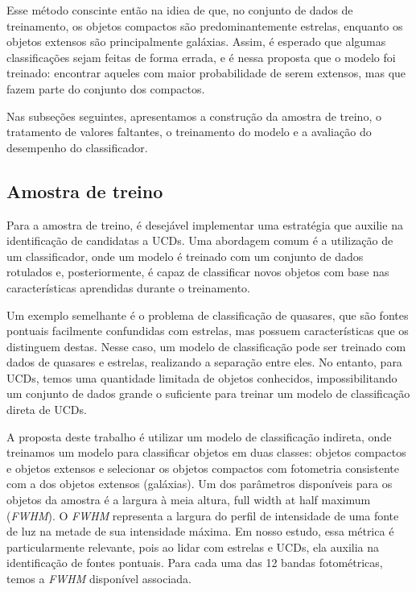 Esse método conscinte então na idiea de que, no conjunto de dados de treinamento, os objetos compactos são predominantemente estrelas, enquanto os objetos extensos são principalmente galáxias. Assim, é esperado que algumas classificações sejam feitas de forma errada, e é nessa proposta que o modelo foi treinado: encontrar aqueles com maior probabilidade de serem extensos, mas que fazem parte do conjunto dos compactos.

Nas subseções seguintes, apresentamos a construção da amostra de treino, o tratamento de valores faltantes, o treinamento do modelo e a avaliação do desempenho do classificador.

\subsection{Amostra de treino}\label{subsec:amostra_treino}
Para a amostra de treino, é desejável implementar uma estratégia que auxilie na identificação de candidatas a UCDs. Uma abordagem comum é a utilização de um classificador, onde um modelo é treinado com um conjunto de dados rotulados e, posteriormente, é capaz de classificar novos objetos com base nas características aprendidas durante o treinamento.

Um exemplo semelhante é o problema de classificação de quasares, que são fontes pontuais facilmente confundidas com estrelas, mas possuem características que os distinguem destas. Nesse caso, um modelo de classificação pode ser treinado com dados de quasares e estrelas, realizando a separação entre eles. No entanto, para UCDs, temos uma quantidade limitada de objetos conhecidos, impossibilitando um conjunto de dados grande o suficiente para treinar um modelo de classificação direta de UCDs.

A proposta deste trabalho é utilizar um modelo de classificação indireta, onde treinamos um modelo para classificar objetos em duas classes: objetos compactos e objetos extensos e selecionar os objetos compactos com fotometria consistente com a dos objetos extensos (galáxias). Um dos parâmetros disponíveis para os objetos da amostra é a largura à meia altura, full width at half maximum (\textit{FWHM}). O \textit{FWHM} representa a largura do perfil de intensidade de uma fonte de luz na metade de sua intensidade máxima. Em nosso estudo, essa métrica é particularmente relevante, pois ao lidar com estrelas e UCDs, ela auxilia na identificação de fontes pontuais. Para cada uma das 12 bandas fotométricas, temos a \textit{FWHM} disponível associada.


